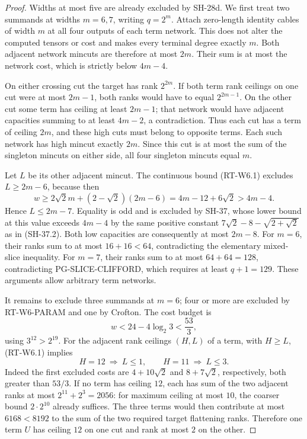 \begin{proof}
Widths at most five are already excluded by SH-28d.
We first treat two summands at widths $m=6,7$, writing
$q=2^m$.  Attach zero-length identity cables of width $m$
at all four outputs of each term network.  This does not
alter the computed tensors or cost and makes every
terminal degree exactly $m$.  Both adjacent network
mincuts are therefore at most $2m$.  Their sum is at
most the network cost, which is strictly below $4m-4$.

On either crossing cut the target has rank $2^{2m}$.
If both term rank ceilings on one cut were at most
$2m-1$, both ranks would have to equal $2^{2m-1}$.
On the other cut some term has ceiling at least $2m-1$;
that network would have adjacent capacities summing to
at least $4m-2$, a contradiction.  Thus each cut has a
term of ceiling $2m$, and these high cuts must belong
to opposite terms.  Each such network has high mincut
exactly $2m$.  Since this cut is at most the sum of
the singleton mincuts on either side, all four singleton
mincuts equal $m$.

Let $L$ be its other adjacent mincut.  The continuous
bound (RT-W6.1) excludes $L\ge2m-6$, because then
\[
 w\ge2\sqrt2m+(2-\sqrt2)(2m-6)
       =4m-12+6\sqrt2>4m-4.
\]
Hence $L\le2m-7$.  Equality is odd and is excluded by
SH-37, whose lower bound at this value exceeds $4m-4$
by the same positive constant
$7\sqrt2-8-\sqrt{2+\sqrt2}$ as in (SH-37.2).
Both low capacities are consequently at most $2m-8$.
For $m=6$, their ranks sum to at most $16+16<64$,
contradicting the elementary mixed-slice inequality.
For $m=7$, their ranks sum to at most $64+64=128$,
contradicting PG-SLICE-CLIFFORD, which requires at least
$q+1=129$.  These arguments allow arbitrary term networks.

It remains to exclude three summands at $m=6$; four or
more are excluded by RT-W6-PARAM and one by Crofton.
The cost budget is
\[
 w<24-4\log_2 3<\frac{53}{3},
\]
using $3^{12}>2^{19}$.  For the adjacent rank ceilings
$(H,L)$ of a term, with $H\ge L$, (RT-W6.1) implies
\[
 H=12\ \Longrightarrow\ L\le1,\qquad
 H=11\ \Longrightarrow\ L\le3.                       \tag{SH-38.1}
\]
Indeed the first excluded costs are $4+10\sqrt2$ and
$8+7\sqrt2$, respectively, both greater than $53/3$.
If no term has ceiling $12$, each has sum of the two
adjacent ranks at most $2^{11}+2^3=2056$: for maximum
ceiling at most $10$, the coarser bound $2\cdot2^{10}$
already suffices.  The three terms would then contribute
at most $6168<8192$ to the sum of the two required
target flattening ranks.  Therefore one term $U$ has
ceiling $12$ on one cut and rank at most $2$ on the other.


\end{proof}
